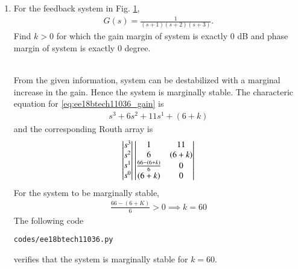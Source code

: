 \begin{enumerate}[label=\thesection.\arabic*.,ref=\thesection.\theenumi]

\item For the feedback system in Fig. \ref{fig:ee18btech11036},
%
\begin{align}
G(s) = \frac{1}{(s+1)(s+2)(s+3)}.
\label{eq:ee18btech11036_gain}
\end{align}
%
Find $k > 0$ for which the gain margin of system is exactly 0 dB and phase margin of system is exactly 0 degree.
\begin{figure}[!ht]
	\begin{center}
		
		\resizebox{\columnwidth}{!}{}
	\end{center}
\caption{}
\label{fig:ee18btech11036}
\end{figure}
\\
\solution From the given information, system can be destabilized with a marginal increase in the gain. Hence the system is marginally stable.  The characteric equation for \eqref{eq:ee18btech11036_gain} is
\begin{align}
s^3+6s^2+11s^1+(6+k)
\end{align}
and the corresponding  Routh array is
\begin{align}
\begin{vmatrix}s^3\\s^2\\s^1 \\ s^0\end{vmatrix}
\begin{vmatrix}1 & 11 \\ 6 & (6+k) \\  \frac{66-(6+k)}{6} & 0\\ (6+k) & 0\end{vmatrix}
\end{align}
%
For the system to be  marginally stable,
%
\begin{align}
    \frac{66-(6+K)}{6}>0 \implies 
k=60
\end{align}
%
The following code
\begin{lstlisting}
codes/ee18btech11036.py
\end{lstlisting}
%
verifies that the system is marginally stable for $k = 60$.
\end{enumerate}





